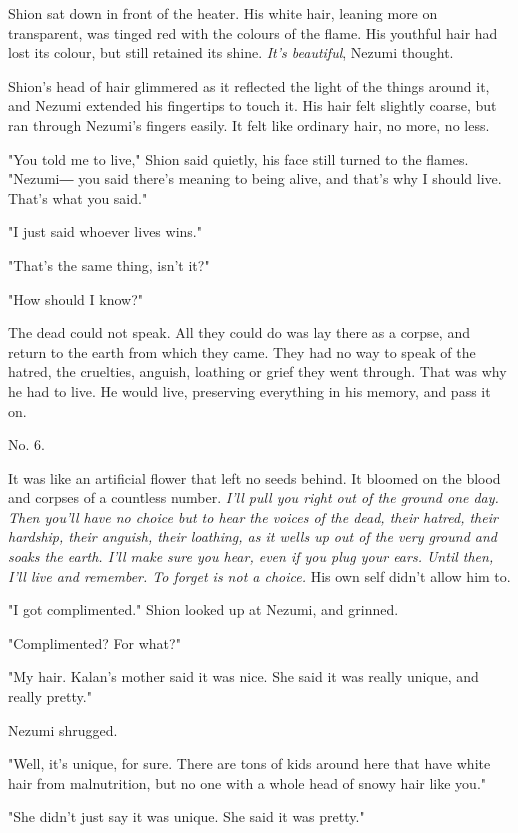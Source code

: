 Shion sat down in front of the heater. His white hair, leaning more on
transparent, was tinged red with the colours of the flame. His youthful
hair had lost its colour, but still retained its shine. \emph{It's beautiful},
Nezumi thought.

Shion's head of hair glimmered as it reflected the light of the things
around it, and Nezumi extended his fingertips to touch it. His hair felt
slightly coarse, but ran through Nezumi's fingers easily. It felt like
ordinary hair, no more, no less.

"You told me to live," Shion said quietly, his face still turned to the
flames. "Nezumi― you said there's meaning to being alive, and that's why
I should live. That's what you said."

"I just said whoever lives wins."

"That's the same thing, isn't it?"

"How should I know?"

The dead could not speak. All they could do was lay there as a corpse,
and return to the earth from which they came. They had no way to speak
of the hatred, the cruelties, anguish, loathing or grief they went
through. That was why he had to live. He would live, preserving
everything in his memory, and pass it on.

No. 6.~

It was like an artificial flower that left no seeds behind. It bloomed
on the blood and corpses of a countless number. \emph{I'll pull you right out
	of the ground one day. Then you'll have no choice but to hear the voices
	of the dead, their hatred, their hardship, their anguish, their
	loathing, as it wells up out of the very ground and soaks the earth.
	I'll make sure you hear, even if you plug your ears. Until then, I'll
	live and remember. To forget is not a choice.} His own self didn't allow
him to.

"I got complimented." Shion looked up at Nezumi, and grinned.

"Complimented? For what?"

"My hair. Kalan's mother said it was nice. She said it was really
unique, and really pretty."

Nezumi shrugged.

"Well, it's unique, for sure. There are tons of kids around here that
have white hair from malnutrition, but no one with a whole head of snowy
hair like you."

"She didn't just say it was unique. She said it was pretty."


